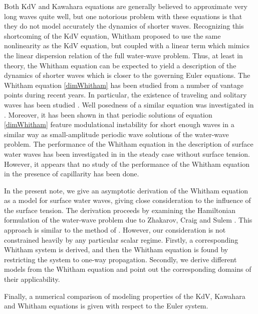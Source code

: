 Both KdV and Kawahara equations are generally believed to approximate
very long waves quite well,
but one notorious problem with these equations is that they do not model
accurately the dynamics of shorter waves.
Recognizing this shortcoming of the KdV equation, Whitham proposed to use
the same nonlinearity as the KdV equation, but coupled with a linear term
which mimics the linear dispersion relation of the full water-wave problem.
Thus, at least in theory, 
the Whitham equation can be expected to yield a 
description of the dynamics of shorter waves which is closer to
the governing Euler equations.
The Whitham equation \eqref{dimWhitham} has been studied from
a number of vantage points during recent years.
In particular, the existence of traveling and solitary waves
has been studied  \citep{Minzoni2013, Ehrnstrom2012, Ehrnstrom2009, Ehrnstrom2013}.
Well posedness of a similar equation
was investigated in \cite{Lannes2013}.
Moreover, it has been shown
in \citep{Hur2015, Hur2015104,Sanford2014}
that periodic solutions of equation \eqref{dimWhitham}
feature modulational instability 
for short enough waves in a similar way as small-amplitude periodic wave
solutions of the water-wave problem. 
The performance of the Whitham equation in the description of surface water
waves has been investigated in \cite{Borluk2016} in the steady case without surface tension.
However, it appears that no study of the performance of the Whitham equation
in the presence of capillarity has been done.

In the present note, we give an asymptotic derivation of the Whitham equation
as a model for surface water waves, 
giving close consideration to the influence of the surface tension.
The derivation proceeds by examining the Hamiltonian
formulation of the water-wave problem due to Zhakarov, Craig and Sulem \cite{Zakharov1968, Craig1993}.
This approach is similar to the method of \cite{Craig1994}.
However, our consideration is not constrained heavily
by any particular scalar regime.
Firstly, a corresponding Whitham system is derived, and then the Whitham
equation is found by restricting the system to one-way propagation.
Secondly, we derive different models from the Whitham equation
and point out the corresponding domains of their applicability.

Finally, a numerical comparison of modeling properties
of the KdV, Kawahara and Whitham equations is given
with respect to the Euler system. 


